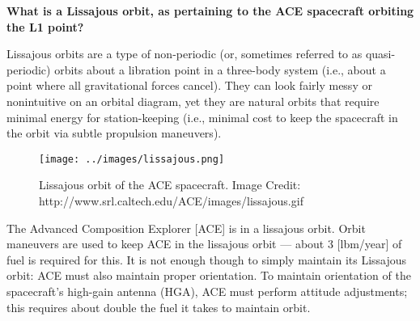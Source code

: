 \textbf{What is a Lissajous orbit, as pertaining to the ACE spacecraft orbiting the L1 point?}

Lissajous orbits are a type of non-periodic (or, sometimes referred to
as quasi-periodic) orbits about a libration point in a three-body system
(i.e., about a point where all gravitational forces cancel). They can
look fairly messy or nonintuitive on an orbital diagram, yet they are
natural orbits that require minimal energy for station-keeping (i.e.,
minimal cost to keep the spacecraft in the orbit via subtle propulsion
maneuvers). 


\begin{figure}[h]
  \centering
  \texttt{[image: ../images/lissajous.png]}
  \caption{Lissajous orbit of the ACE spacecraft. Image Credit:
  http://www.srl.caltech.edu/ACE/images/lissajous.gif}
  \label{fig-lissajous}
\end{figure}

The Advanced Composition Explorer [ACE] \citep{Stone1998} is in a
lissajous orbit. Orbit maneuvers are used to keep ACE in the lissajous
orbit --- about 3 [lbm/year] of fuel is required for this. It is not
enough though to simply maintain its Lissajous orbit: ACE must also maintain proper orientation.  To maintain orientation of the spacecraft's high-gain antenna
(HGA), ACE must perform attitude adjustments; this requires about double
the fuel it takes to maintain orbit.
